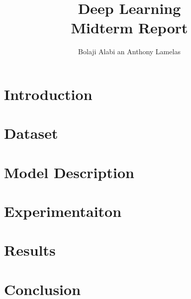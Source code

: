 \documentclass[11pt]{article}
\begin{document}
\title{Deep Learning \\
Midterm Report}
\author{Bolaji Alabi an Anthony Lamelas}
\date{}
\maketitle

\section{Introduction}

\section{Dataset}

\section{Model Description}

\section{Experimentaiton}

\section{Results}

\section{Conclusion}
\end{document}
